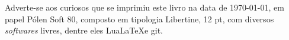 \pagebreak


\ifodd\thepage\blankpage\fi

\parindent=0pt
\footnotesize\thispagestyle{empty}









\mbox{}\vfill
\begin{center}
		\begin{minipage}{.7\textwidth}\tiny\noindent{}
		\centering\tiny
Adverte-se aos curiosos que se imprimiu este livro na data de \today, em papel 
		Pólen Soft 80, composto em tipologia Libertine, 12 pt, 
		com diversos \textit{softwares} livres,
		dentre eles Lua\LaTeX e git.\\ 
		\medskip\\\
		\end{minipage}
\end{center}